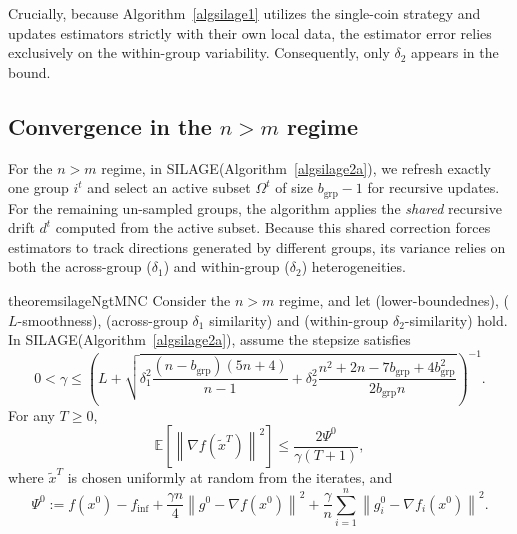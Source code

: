 \documentclass{article}
\newcommand{\bb}{\mathbb}
\newcommand{\R}{\bb R}
\newcommand{\sqn}[1]{\left\| #1 \right\|^2}
\newcommand{\nf}[1]{\nabla f\rb{#1}}
\newcommand{\finf}{f_\mathrm{inf}}
\newcommand{\eqdef}{:=}
\newcommand{\Exp}[1]{{\bb E}\left[#1\right]}
\newcommand{\rb}[1]{\left(#1\right)}
\newcommand {\rbl}[1]{(#1)} %
\renewcommand{\nf}[1]{\nabla f\rbl{#1}}
\newcommand{\nfi}[1]{\nabla f_i\rbl{#1}}
\theoremstyle{plain}
\newcommand{\algno}{{\sf\scalefont{0.88}\color{mydarkgreen}SILAGE}\xspace}
\begin{document}
Crucially, because Algorithm~\ref{algsilage1} utilizes the single-coin strategy and updates estimators strictly with their own local data, the estimator error relies exclusively on the within-group variability. Consequently, only $\delta_2$ appears in the bound.

\subsection{Convergence in the $n > m$ regime}
\label{subsec:silage_ngt_m_convergence}

For the $n > m$ regime, in \algno (Algorithm~\ref{algsilage2a}), we refresh exactly one group $i^t$ and select an active subset $\Omega^t$ of size $b_{\mathrm{grp}}-1$ for recursive updates. For the remaining un-sampled groups, the algorithm applies the \emph{shared} recursive drift $d^t$ computed from the active subset. Because this shared correction forces estimators to track directions generated by different groups, its variance relies on both the across-group ($\delta_1$) and within-group ($\delta_2$) heterogeneities.

\begin{restatable}{theorem}{silageNgtMNC}
\label{theo2} Consider the $n>m$ regime, and let  (lower-boundednes),  ($L$-smoothness),  (across-group $\delta_1$ similarity) and  (within-group $\delta_2$-similarity) hold. In \algno (Algorithm~\ref{algsilage2a}),
assume the stepsize satisfies \[0<\gamma\le \rb{L+\sqrt{\delta_1^2\frac{(n-b_{\mathrm{grp}})(5n+4)}{n-1} +\delta_2^2\frac{n^2+2n-7b_{\mathrm{grp}}+4b_{\mathrm{grp}}^2}{2b_{\mathrm{grp}}n}}}^{-1}.\] For any $T \ge 0$, 
\begin{equation}\label{eq:b98fdy980fdg}  \Exp{\sqn{\nf{\tilde{x}^T}}} \le \frac{2\Psi^0}{\gamma(T+1)},\end{equation} where
 $\tilde{x}^T$ is chosen uniformly at random from the iterates, 
and
\[\Psi^0 \eqdef f(x^0)-\finf +\frac{\gamma n}{4}\sqn{g^0-\nf{x^0}} +\frac{\gamma}{n}\sum_{i=1}^n\sqn{g_i^0-\nfi{x^0}}.\]
\end{restatable}
\end{document}
